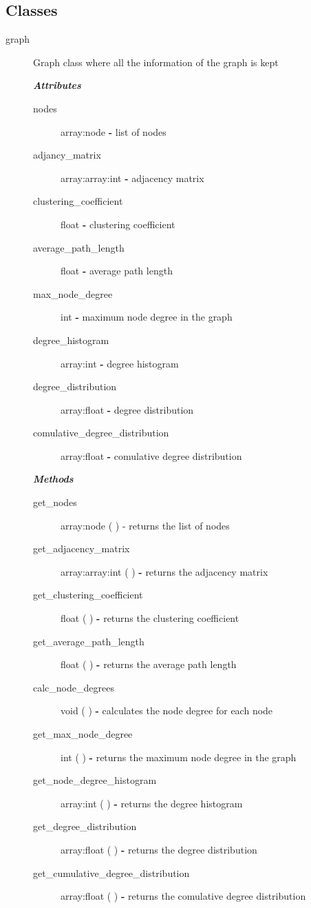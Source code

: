 \documentclass[a4paper,titlepage,11pt]{article}
\begin{document}
\subsection*{Classes}
\begin{description}
\item [graph] Graph class where all the information of the graph is kept

\textit{ \textbf{Attributes} }
\begin{description}
\item [ nodes ] array:node \textbf{-} list of nodes
\item [ adjancy\_matrix ] array:array:int \textbf{-} adjacency matrix
\item [ clustering\_coefficient ] float \textbf{-} clustering coefficient
\item [ average\_path\_length ] float \textbf{-} average path length
\item [ max\_node\_degree ] int \textbf{-} maximum node degree in the graph
\item [ degree\_histogram ] array:int \textbf{-} degree histogram
\item [ degree\_distribution ] array:float \textbf{-} degree distribution
\item [ comulative\_degree\_distribution ] array:float \textbf{-} comulative degree distribution
\end{description}

\textit{ \textbf{Methods} }
\begin{description}
\item [get\_nodes] array:node ( ) - returns the list of nodes
\item [get\_adjacency\_matrix] array:array:int ( ) \textbf{-} returns the adjacency matrix
\item [get\_clustering\_coefficient] float ( ) \textbf{-} returns the clustering coefficient
\item [get\_average\_path\_length] float ( ) \textbf{-} returns the average path length
\item [calc\_node\_degrees] void ( ) \textbf{-} calculates the node degree for each node
\item [get\_max\_node\_degree] int ( ) \textbf{-} returns the maximum node degree in the graph
\item [get\_node\_degree\_histogram] array:int ( ) \textbf{-} returns the degree histogram
\item [get\_degree\_distribution] array:float ( ) \textbf{-} returns the degree distribution
\item [get\_cumulative\_degree\_distribution] array:float ( ) \textbf{-} returns the comulative degree distribution
\end{description}


\end{description}
\end{document}
